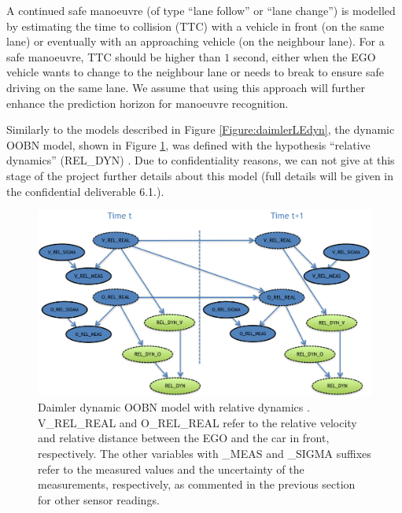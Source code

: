A continued safe manoeuvre (of type ``lane follow'' or ``lane change'') is modelled by estimating the time to collision (TTC) with a vehicle in front (on the same lane) or eventually with an approaching vehicle (on the neighbour lane). For a safe manoeuvre, TTC should be higher than $1$ second, either when the EGO vehicle wants to change to the neighbour lane or needs to break to ensure safe driving on the same lane. We assume that using this approach will further enhance the prediction horizon for manoeuvre recognition.

Similarly to the models described in Figure \ref{Figure:daimlerLEdyn}, the dynamic OOBN model, shown in Figure \ref{Figure:daimlerreldyn}, was defined with the hypothesis ``relative dynamics'' (REL\_DYN) \cite{SlavaThesis2014}. Due to confidentiality reasons, we can not give at this stage of the project further details about this model (full details will be given in the confidential deliverable 6.1.).

 
\begin{figure}[ht!]
\begin{center}
\includegraphics[scale=0.48]{./figures/Daimlerreldyn.png}
\end{center}
\caption{\label{Figure:daimlerreldyn}Daimler dynamic OOBN model with relative dynamics \cite{SlavaThesis2014}. V\_REL\_REAL and O\_REL\_REAL refer to the relative velocity and relative distance between the EGO and the car in front, respectively. The other variables with \_MEAS and \_SIGMA suffixes refer to the measured values and the uncertainty of the measurements, respectively, as commented in the previous section for other sensor readings.}
\end{figure}

